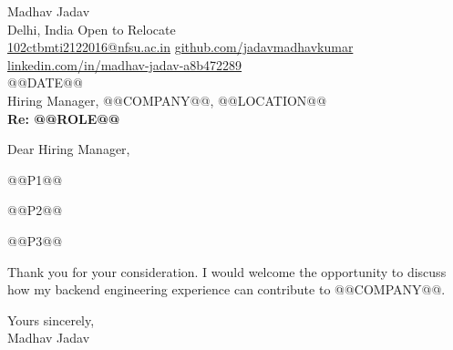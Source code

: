 \documentclass[10pt,letterpaper]{article}
\begin{document}
\begin{flushleft}
Madhav Jadav\\
Delhi, India \textbar{} Open to Relocate\\
\href{mailto:102ctbmti2122016@nfsu.ac.in}{102ctbmti2122016@nfsu.ac.in} \textbar{} \href{https://github.com/jadavmadhavkumar}{github.com/jadavmadhavkumar} \textbar{} \href{https://www.linkedin.com/in/madhav-jadav-a8b472289}{linkedin.com/in/madhav-jadav-a8b472289}\\[8pt]
@@DATE@@\\[4pt]
Hiring Manager, @@COMPANY@@, @@LOCATION@@\\[8pt]
\textbf{Re: @@ROLE@@}\\[8pt]
\end{flushleft}
Dear Hiring Manager,

@@P1@@

@@P2@@

@@P3@@

Thank you for your consideration. I would welcome the opportunity to discuss how my backend engineering experience can contribute to @@COMPANY@@.

Yours sincerely,\\[8pt]
Madhav Jadav
\end{document}
